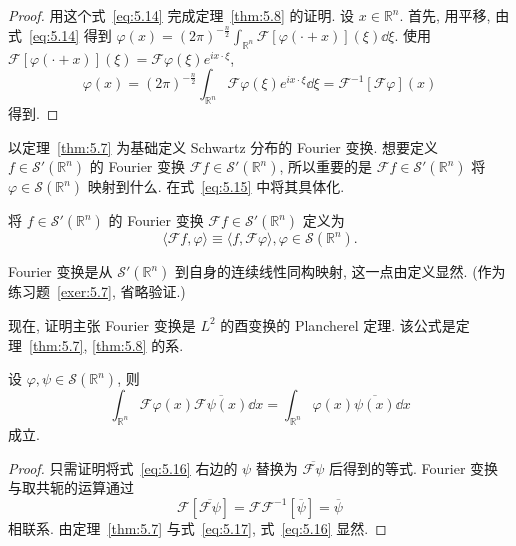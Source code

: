 \begin{proof}
用这个式~\eqref{eq:5.14} 完成定理~\ref{thm:5.8} 的证明. 设 $x \in \mathbb{R}^{n}$. 首先, 用平移, 由式~\eqref{eq:5.14} 得到 $\varphi(x) = (2\pi)^{-\frac{n}{2}}\int_{\mathbb{R}^{n}}\mathcal{F}[\varphi(\cdot + x)](\xi)\dd \xi$. 使用 $\mathcal{F}[\varphi(\cdot + x)](\xi) = \mathcal{F}\varphi(\xi)e^{ix \cdot \xi}$,
\[
\varphi(x) = (2\pi)^{-\frac{n}{2}}\int_{\mathbb{R}^{n}}\mathcal{F}\varphi(\xi)e^{ix \cdot \xi}\dd \xi = \mathcal{F}^{-1}[\mathcal{F}\varphi](x)
\]
得到.
\end{proof}

以定理~\ref{thm:5.7} 为基础定义 Schwartz 分布的 Fourier 变换. 想要定义 $f \in \mathcal{S}'(\mathbb{R}^{n})$ 的 Fourier 变换 $\mathcal{F}f \in \mathcal{S}'(\mathbb{R}^{n})$, 所以重要的是 $\mathcal{F}f \in \mathcal{S}'(\mathbb{R}^{n})$ 将 $\varphi \in \mathcal{S}(\mathbb{R}^{n})$ 映射到什么. 在式~\eqref{eq:5.15} 中将其具体化.

\begin{definition}\label{def:5.5}
将 $f \in \mathcal{S}'(\mathbb{R}^{n})$ 的 Fourier 变换 $\mathcal{F}f \in \mathcal{S}'(\mathbb{R}^{n})$ 定义为
\begin{equation}\tag{5.15}
\langle\mathcal{F}f, \varphi\rangle \equiv \langle f, \mathcal{F}\varphi\rangle, \varphi \in \mathcal{S}(\mathbb{R}^{n}).
\label{eq:5.15}
\end{equation}
\end{definition}

Fourier 变换是从 $\mathcal{S}'(\mathbb{R}^{n})$ 到自身的连续线性同构映射, 这一点由定义显然. (作为练习题~\ref{exer:5.7}, 省略验证.)

现在, 证明主张 Fourier 变换是 $L^{2}$ 的酉变换的 Plancherel 定理. 该公式是定理~\ref{thm:5.7}, \ref{thm:5.8} 的系.

\begin{theorem}[Plancherel 定理]\label{thm:5.9}
设 $\varphi, \psi \in \mathcal{S}(\mathbb{R}^{n})$, 则
\begin{equation}\tag{5.16}
\int_{\mathbb{R}^{n}}\mathcal{F}\varphi(x)\overline{\mathcal{F}\psi(x)}\dd x = \int_{\mathbb{R}^{n}}\varphi(x)\overline{\psi(x)}\dd x
\label{eq:5.16}
\end{equation}
成立.
\end{theorem}

\begin{proof}
只需证明将式~\eqref{eq:5.16} 右边的 $\psi$ 替换为 $\overline{\mathcal{F}\psi}$ 后得到的等式. Fourier 变换与取共轭的运算通过
\begin{equation}\tag{5.17}
\mathcal{F}[\overline{\mathcal{F}\psi}] = \mathcal{F}\mathcal{F}^{-1}[\overline{\psi}] = \overline{\psi}
\label{eq:5.17}
\end{equation}
相联系. 由定理~\ref{thm:5.7} 与式~\eqref{eq:5.17}, 式~\eqref{eq:5.16} 显然.
\end{proof}

